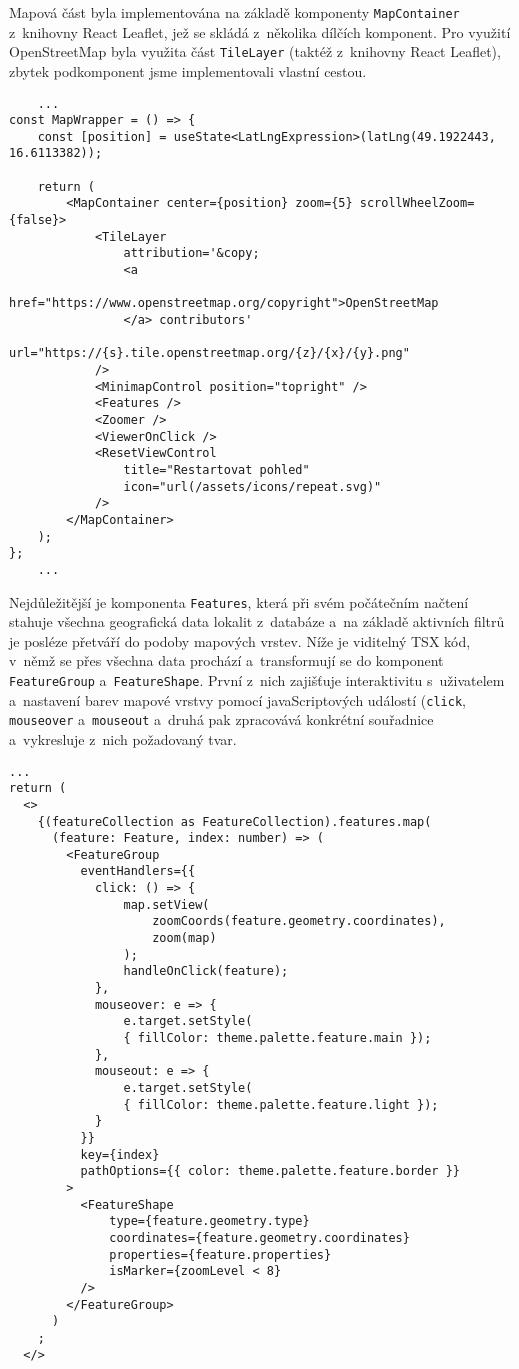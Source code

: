 Mapová část byla implementována na základě komponenty \verb|MapContainer| z~knihovny React Leaflet, jež se skládá z~několika dílčích komponent. Pro využití OpenStreetMap byla využita část \verb|TileLayer| (taktéž z~knihovny React Leaflet), zbytek podkomponent jsme implementovali vlastní cestou.

\begin{verbatim}
    ...
const MapWrapper = () => {
    const [position] = useState<LatLngExpression>(latLng(49.1922443, 16.6113382));

    return (
        <MapContainer center={position} zoom={5} scrollWheelZoom={false}>
            <TileLayer
                attribution='&copy;
                <a
                href="https://www.openstreetmap.org/copyright">OpenStreetMap
                </a> contributors'
                url="https://{s}.tile.openstreetmap.org/{z}/{x}/{y}.png"
            />
            <MinimapControl position="topright" />
            <Features />
            <Zoomer />
            <ViewerOnClick />
            <ResetViewControl
                title="Restartovat pohled"
                icon="url(/assets/icons/repeat.svg)"
            />
        </MapContainer>
    );
};
    ...
    \end{verbatim}

Nejdůležitější je komponenta \verb|Features|, která při svém počátečním načtení stahuje všechna geografická data lokalit z~databáze a~na základě aktivních filtrů je posléze přetváří do podoby mapových vrstev. Níže je viditelný TSX kód, v~němž se přes všechna data prochází a~transformují se do komponent \verb|FeatureGroup| a~\verb|FeatureShape|. První z~nich zajišťuje interaktivitu s~uživatelem a~nastavení barev mapové vrstvy pomocí javaScriptových událostí (\verb|click|, \verb|mouseover| a~\verb|mouseout| a~druhá pak zpracovává konkrétní souřadnice a~vykresluje z~nich požadovaný tvar.

\begin{verbatim}
...
return (
  <>
    {(featureCollection as FeatureCollection).features.map(
      (feature: Feature, index: number) => (
        <FeatureGroup
          eventHandlers={{
            click: () => {
                map.setView(
                    zoomCoords(feature.geometry.coordinates),
                    zoom(map)
                );
                handleOnClick(feature);
            },
            mouseover: e => {
                e.target.setStyle(
                { fillColor: theme.palette.feature.main });
            },
            mouseout: e => {
                e.target.setStyle(
                { fillColor: theme.palette.feature.light });
            }
          }}
          key={index}
          pathOptions={{ color: theme.palette.feature.border }}
        >
          <FeatureShape
              type={feature.geometry.type}
              coordinates={feature.geometry.coordinates}
              properties={feature.properties}
              isMarker={zoomLevel < 8}
          />
        </FeatureGroup>
      )
    ;
  </>
\end{verbatim}
